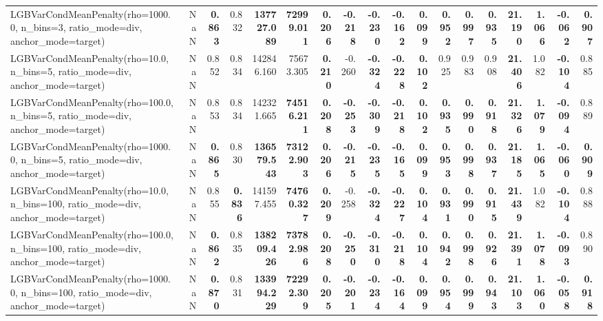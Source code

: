 \documentclass[11pt]{article}
\theoremstyle{plain}
\theoremstyle{definition}
\newcommand{\1}{\mathbf{1}}
\begin{document}
\begin{table}[htbp]
{\begin{tabular}{lrrrrrrrrrrrrrrrrr}
LGBVarCondMeanPenalty(rho=1000.0, n\_bins=3, ratio\_mode=div, anchor\_mode=target) & NaN & \textbf{0.863} & 0.832 & \textbf{137727.089} & \textbf{72999.011} & \textbf{0.206} & \textbf{-0.218} & \textbf{-0.230} & \textbf{-0.162} & \textbf{0.099} & \textbf{0.952} & \textbf{0.997} & \textbf{0.935} & \textbf{21.190} & \textbf{1.066} & \textbf{-0.062} & \textbf{0.907} \\
LGBVarCondMeanPenalty(rho=10.0, n\_bins=5, ratio\_mode=div, anchor\_mode=target) & NaN & 0.852 & 0.834 & 142846.160 & 75673.305 & \textbf{0.210} & -0.260 & \textbf{-0.324} & \textbf{-0.228} & \textbf{0.102} & 0.925 & 0.983 & 0.908 & \textbf{21.406} & 1.082 & \textbf{-0.104} & 0.885 \\
LGBVarCondMeanPenalty(rho=100.0, n\_bins=5, ratio\_mode=div, anchor\_mode=target) & NaN & 0.853 & 0.834 & 142321.665 & \textbf{74516.211} & \textbf{0.208} & \textbf{-0.253} & \textbf{-0.309} & \textbf{-0.218} & \textbf{0.102} & \textbf{0.935} & \textbf{0.990} & \textbf{0.918} & \textbf{21.326} & \textbf{1.079} & \textbf{-0.094} & 0.889 \\
LGBVarCondMeanPenalty(rho=1000.0, n\_bins=5, ratio\_mode=div, anchor\_mode=target) & NaN & \textbf{0.865} & 0.830 & \textbf{136579.543} & \textbf{73122.903} & \textbf{0.206} & \textbf{-0.215} & \textbf{-0.235} & \textbf{-0.165} & \textbf{0.099} & \textbf{0.953} & \textbf{0.998} & \textbf{0.937} & \textbf{21.185} & \textbf{1.065} & \textbf{-0.060} & \textbf{0.909} \\
LGBVarCondMeanPenalty(rho=10.0, n\_bins=100, ratio\_mode=div, anchor\_mode=target) & NaN & 0.855 & \textbf{0.836} & 141597.455 & \textbf{74760.327} & \textbf{0.209} & -0.258 & \textbf{-0.324} & \textbf{-0.227} & \textbf{0.104} & \textbf{0.931} & \textbf{0.990} & \textbf{0.915} & \textbf{21.439} & 1.082 & \textbf{-0.104} & 0.888 \\
LGBVarCondMeanPenalty(rho=100.0, n\_bins=100, ratio\_mode=div, anchor\_mode=target) & NaN & \textbf{0.862} & 0.835 & \textbf{138209.426} & \textbf{73782.986} & \textbf{0.208} & \textbf{-0.250} & \textbf{-0.310} & \textbf{-0.218} & \textbf{0.104} & \textbf{0.942} & \textbf{0.998} & \textbf{0.926} & \textbf{21.391} & \textbf{1.078} & \textbf{-0.093} & 0.890 \\
LGBVarCondMeanPenalty(rho=1000.0, n\_bins=100, ratio\_mode=div, anchor\_mode=target) & NaN & \textbf{0.870} & 0.831 & \textbf{133994.229} & \textbf{72292.309} & \textbf{0.205} & \textbf{-0.201} & \textbf{-0.234} & \textbf{-0.164} & \textbf{0.099} & \textbf{0.954} & \textbf{0.999} & \textbf{0.943} & \textbf{21.103} & \textbf{1.060} & \textbf{-0.058} & \textbf{0.918} \\

\end{tabular}}
\end{table}
\end{document}
